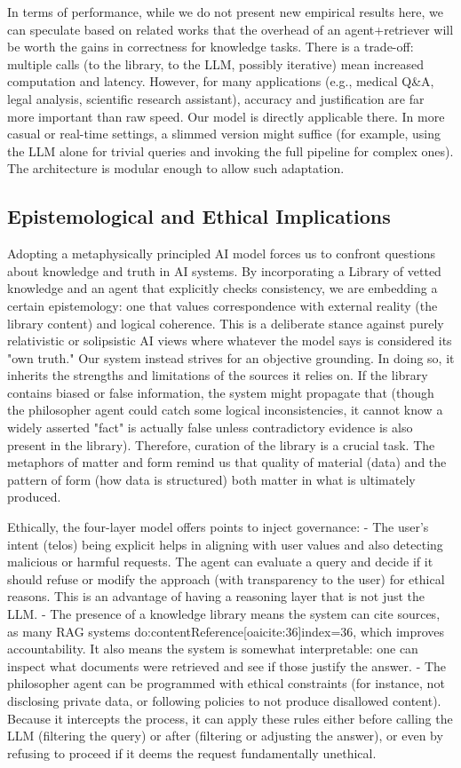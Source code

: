 \documentclass{article}
\begin{document}
In terms of performance, while we do not present new empirical results here, we can speculate based on related works that the overhead of an agent+retriever will be worth the gains in correctness for knowledge tasks. There is a trade-off: multiple calls (to the library, to the LLM, possibly iterative) mean increased computation and latency. However, for many applications (e.g., medical Q\&A, legal analysis, scientific research assistant), accuracy and justification are far more important than raw speed. Our model is directly applicable there. In more casual or real-time settings, a slimmed version might suffice (for example, using the LLM alone for trivial queries and invoking the full pipeline for complex ones). The architecture is modular enough to allow such adaptation.

\subsection{Epistemological and Ethical Implications}
Adopting a metaphysically principled AI model forces us to confront questions about knowledge and truth in AI systems. By incorporating a Library of vetted knowledge and an agent that explicitly checks consistency, we are embedding a certain epistemology: one that values correspondence with external reality (the library content) and logical coherence. This is a deliberate stance against purely relativistic or solipsistic AI views where whatever the model says is considered its "own truth." Our system instead strives for an objective grounding. In doing so, it inherits the strengths and limitations of the sources it relies on. If the library contains biased or false information, the system might propagate that (though the philosopher agent could catch some logical inconsistencies, it cannot know a widely asserted "fact" is actually false unless contradictory evidence is also present in the library). Therefore, curation of the library is a crucial task. The metaphors of matter and form remind us that quality of material (data) and the pattern of form (how data is structured) both matter in what is ultimately produced.

Ethically, the four-layer model offers points to inject governance:
- The user’s intent (telos) being explicit helps in aligning with user values and also detecting malicious or harmful requests. The agent can evaluate a query and decide if it should refuse or modify the approach (with transparency to the user) for ethical reasons. This is an advantage of having a reasoning layer that is not just the LLM.
- The presence of a knowledge library means the system can cite sources, as many RAG systems do:contentReference[oaicite:36]{index=36}, which improves accountability. It also means the system is somewhat interpretable: one can inspect what documents were retrieved and see if those justify the answer.
- The philosopher agent can be programmed with ethical constraints (for instance, not disclosing private data, or following policies to not produce disallowed content). Because it intercepts the process, it can apply these rules either before calling the LLM (filtering the query) or after (filtering or adjusting the answer), or even by refusing to proceed if it deems the request fundamentally unethical. 
\end{document}
